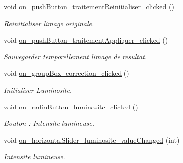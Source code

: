 \begin{DoxyCompactItemize}
\mbox{\label{classMainWindow_a13a2050ed2e2434b34f8e78917782680}} 
void \hyperlink{classMainWindow_a13a2050ed2e2434b34f8e78917782680}{on\+\_\+push\+Button\+\_\+traitement\+Reinitialiser\+\_\+clicked} ()
\begin{DoxyCompactList}\small\item\em Reinitialiser l\textquotesingle{}image originale. \end{DoxyCompactList}\item 
\mbox{\label{classMainWindow_a95dfac4432df7db5a514e297568d9c4b}} 
void \hyperlink{classMainWindow_a95dfac4432df7db5a514e297568d9c4b}{on\+\_\+push\+Button\+\_\+traitement\+Appliquer\+\_\+clicked} ()
\begin{DoxyCompactList}\small\item\em Sauvegarder temporellement l\textquotesingle{}image de resultat. \end{DoxyCompactList}\item 
\mbox{\label{classMainWindow_af6a18794abeab4023d0c80e287c7f27c}} 
void \hyperlink{classMainWindow_af6a18794abeab4023d0c80e287c7f27c}{on\+\_\+group\+Box\+\_\+correction\+\_\+clicked} ()
\begin{DoxyCompactList}\small\item\em Initialiser Luminosite. \end{DoxyCompactList}\item 
\mbox{\label{classMainWindow_a46cfe3aff7aa1b223f0b34aaf251e351}} 
void \hyperlink{classMainWindow_a46cfe3aff7aa1b223f0b34aaf251e351}{on\+\_\+radio\+Button\+\_\+luminosite\+\_\+clicked} ()
\begin{DoxyCompactList}\small\item\em Bouton \+: Intensite lumineuse. \end{DoxyCompactList}\item 
\mbox{\label{classMainWindow_a049310c5a29f1b9b0a948e08865ac470}} 
void \hyperlink{classMainWindow_a049310c5a29f1b9b0a948e08865ac470}{on\+\_\+horizontal\+Slider\+\_\+luminosite\+\_\+value\+Changed} (int)
\begin{DoxyCompactList}\small\item\em Intensite lumineuse. \end{DoxyCompactList}\item 

\end{DoxyCompactItemize}
